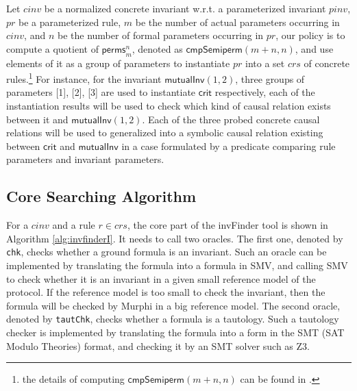 \documentclass{llncs}
\begin{document}
Let $cinv$  be a normalized concrete invariant w.r.t. a parameterized invariant $pinv$, $pr$ be a parameterized rule, $m$ be the number of actual parameters occurring in $cinv$, and $n$  be the number of formal parameters occurring in $pr$,  our policy is to compute a quotient of $\mathsf{perms}_{m}^{n}$, denoted as $\mathsf{cmpSemiperm}(m+n,n )$, and use elements of it as a group of parameters to instantiate $pr$ into a set $crs$ of concrete rules.\footnote{the details of computing $\mathsf{cmpSemiperm}(m+n,n )$ can be found in \cite{LiCache16}.}  For instance, for the invariant $\mathsf{mutualInv}(1,2)$, three groups of parameters [1], [2], [3] are used to instantiate $\mathsf{crit}$ respectively, each of the instantiation results will be used to check which kind of  causal relation exists between it and $\mathsf{mutualInv}(1,2)$.  Each of the three probed concrete causal relations will be used to generalized  into a symbolic causal relation existing between $\mathsf{crit}$ and $\mathsf{mutualInv}$ in a case formulated by a predicate comparing rule parameters and invariant parameters.  %

\subsection{Core Searching Algorithm}\label{sec:coresearchingAlgorithm}

\vspace{-0.3cm}
For a  $cinv$ and a rule $r \in crs$, the core part of the {\sf invFinder} tool is shown in Algorithm \ref{alg:invfinderI}. It needs to call two oracles. The first one, denoted by {\tt chk}, checks whether a ground formula is an invariant. Such an oracle can be implemented by translating the formula into a formula in SMV, and calling SMV to check whether it is an invariant  in a given small reference model of the protocol. If  the reference model is too small to check the invariant, then the formula will be checked by Murphi in a big reference model.  The second oracle, denoted by {\tt tautChk}, checks whether a formula is a tautology. Such a tautology checker is implemented by translating the formula into a form in the SMT (SAT Modulo Theories) format, and checking it by an SMT solver such as Z3.
\end{document}
